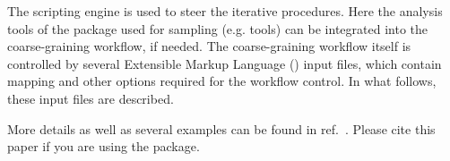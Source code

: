 The scripting engine is used to steer the iterative procedures. Here the analysis tools of the package used for sampling (e.g. \gromacs tools) can be integrated into the coarse-graining workflow, if needed. The coarse-graining workflow itself is controlled by several Extensible Markup Language (\xml) input files, which contain mapping and other options required for the workflow control. In what follows, these input files are described.

More details as well as several examples can be found in ref.~\cite{Ruehle:2009.a}. Please cite this paper if you are using the package. 
